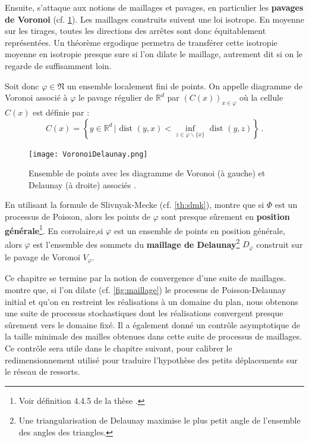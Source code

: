 Ensuite, \citeauthor{balasoiu2020halthesis} s'attaque aux notions de maillages et pavages, en particulier les \textbf{pavages de Voronoi} (cf. \cref{fig:vorodeloau}). Les maillages construits suivent une loi isotrope. En moyenne sur les tirages, toutes les directions des arrêtes sont donc équitablement représentées. Un théorème ergodique permetra de transférer cette isotropie moyenne en isotropie presque sure si l’on dilate le maillage, autrement dit si on le regarde de suffisamment loin. 

\noindent Soit donc $\varphi \in \mathfrak{N}$ un ensemble localement fini de points. On appelle diagramme de Voronoi associé à $\varphi $ le pavage régulier de $\mathbb{R}^d$ par $(C(x))_{x\in \varphi}$ où la cellule $C(x)$ est définie par :
$$
C(x) = \left\{ y \in \mathbb{R}^d \, \big| \text{ dist }(y,x) < \inf_{z\in \varphi\backslash\{x\}}\text{ dist }(y,z) \right\} \,.
$$
\begin{figure}[H]
    \centering
    \texttt{[image: VoronoiDelaunay.png]}\
    \caption{Ensemble de points avec les diagramme de Voronoi (à gauche) et Delaunay (à droite) associés
    \parencite[p.138]{balasoiu2020halthesis}.}
    \label{fig:vorodeloau}
\end{figure}
\noindent En utilisant la formule de Slivnyak-Mecke (cf. \cref{th:slmk}), \citeauthor{balasoiu2020halthesis} montre que si $\Phi$ est un processus de Poisson, alors les points de $\varphi$ sont presque sûrement en \textbf{position générale}\footnote{Voir définition 4.4.5 de la thèse \parencite[p.128]{balasoiu2020halthesis}.}. En corrolaire,si $\varphi$ est un ensemble de points en position générale, alors $\varphi$ est l’ensemble des sommets du \textbf{maillage de Delaunay}\footnote{Une triangularisation de Delaunay maximise le plus petit angle de l'ensemble des angles des triangles.} $D_\varphi$ construit sur le pavage de Voronoi $V_\varphi$.


Ce chapitre se termine par la notion de convergence d'une suite de maillages. \citeauthor{balasoiu2020halthesis} montre que, si l’on dilate (cf. \cref{fig:maillage}) le processus de Poisson-Delaunay initial et qu’on en restreint les réalisations à un domaine du plan, nous obtenons une suite de processus stochastiques dont les réalisations convergent presque sûrement vers le domaine fixé. Il a également donné un contrôle asymptotique de la taille minimale des mailles obtenues dans cette suite de processus de maillages. Ce contrôle sera utile dans le chapitre suivant, pour calibrer le redimensionnement utilisé pour traduire l’hypothèse des petits déplacements sur le réseau de ressorts. 

